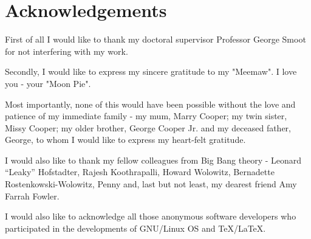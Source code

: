 \chapter*{Acknowledgements}
\label{chap:acknowledgements}

First of all I would like to thank my doctoral supervisor Professor George Smoot for not interfering with my work.

Secondly, I would like to express my sincere gratitude to my "Meemaw". I love you - your "Moon Pie". 

Most importantly, none of this would have been possible without the love and patience of my immediate family - my mum, Marry Cooper; my twin sister, Missy Cooper; my older brother, George Cooper Jr. and my deceased father, George, to whom I would like to express my heart-felt gratitude.

I would also like to thank my fellow colleagues from Big Bang theory - Leonard ``Leaky'' Hofstadter, Rajesh Koothrapalli, Howard Wolowitz, Bernadette Rostenkowski-Wolowitz, Penny and, last but not least, my dearest friend Amy Farrah Fowler.

I would also like to acknowledge all those anonymous software developers who participated in the developments of GNU/Linux OS and \TeX{}/\LaTeX{}.